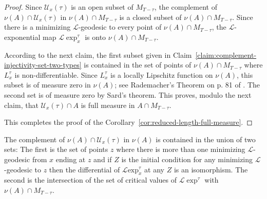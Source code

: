 \begin{proof}
\sketch
Since ${\mathcal U}_x(\tau)$ is an open subset of $M_{T-\tau}$, the complement
of $\nu(A)\cap{\mathcal U}_x(\tau)$ in $\nu(A)\cap M_{T-\tau}$ is a closed
subset of $\nu(A)\cap M_{T-\tau}$. Since there is a minimizing ${\mathcal
L}$-geodesic to every point of $\nu(A)\cap M_{T-\tau}$, the ${\mathcal
L}$-exponential map ${\mathcal L}\exp^\tau_x$ is onto $\nu(A)\cap
M_{T-\tau}$.



 According to the next claim, the first subset given in Claim~\ref{claim:complement-injectivity-set-two-types} is contained in the
set of points of $\nu(A)\cap M_{T-\tau}$ where $L_x^\tau$ is
non-differentiable. Since $L_x^\tau$ is a locally Lipschitz function on
$\nu(A)$, this subset is of measure zero in $\nu(A)$; see Rademacher's Theorem
on p. 81 of \cite{EvansGariepy}. The second set is of measure zero by Sard's
theorem. This proves, modulo the next claim, that ${\mathcal U}_x(\tau)\cap A$
is full measure in $A\cap M_{T-\tau}$.




This completes the proof of the Corollary~\ref{cor:reduced-length-full-measure}.
\end{proof}

\begin{claim}\label{claim:complement-injectivity-set-two-types}
\label{twosets}
The complement of $\nu(A)\cap {\mathcal U}_{x}(\tau)$
in $\nu(A)$ is contained in the union of two sets: The first is the set of
points $z$ where there is more than one minimizing ${\mathcal L}$-geodesic from
$x$ ending at $z$ and if $Z$ is the initial condition for any minimizing
${\mathcal L}$-geodesic to $z$ then the differential of ${\mathcal L}\mathrm{exp}_x^\tau$ at any $Z$ is an isomorphism. The second is the intersection of
the set of critical values of ${\mathcal L}\exp^\tau$ with $\nu(A)\cap
M_{T-\tau}$.
\end{claim}

